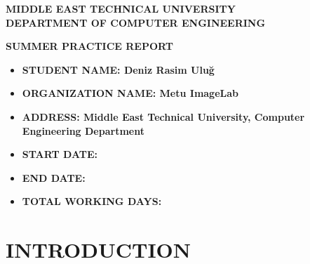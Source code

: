 \documentclass[titlepage, a4paper, 14pt]{extarticle} %
\begin{document}
\begin{titlepage}

\begin{center}

{\large\bfseries MIDDLE EAST TECHNICAL UNIVERSITY\\
               DEPARTMENT OF COMPUTER ENGINEERING\\}
               
               
\vspace{5em}            
{\LARGE\bfseries SUMMER PRACTICE REPORT\\}

\end{center}

\vspace{5em}
\begin{itemize}
\item[] \textbf{STUDENT NAME: Deniz Rasim Uluğ}       %
\item[] \textbf{ORGANIZATION NAME: Metu ImageLab}  %
\item[] \textbf{ADDRESS: Middle East Technical University, Computer Engineering Department }            %
\item[] \textbf{START DATE: }         %
\item[] \textbf{END DATE: }           %
\item[] \textbf{TOTAL WORKING DAYS: } %
\end{itemize}
\vspace{5em}

\begin{minipage}{0.5\textwidth}
\end{minipage}
\begin{minipage}{0.5\textwidth}
\end{minipage}

\end{titlepage}

\tableofcontents
\thispagestyle{empty} %
\newpage              %


\section{INTRODUCTION} \label{intro}
\end{document}
